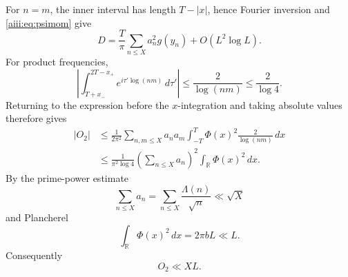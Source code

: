 \documentclass[11pt]{article}
\newcommand{\R}{\mathbb R}
\begin{document}
For $n=m$, the inner interval has length $T-|x|$, hence Fourier inversion
and \eqref{aiii:eq:psimom} give
\begin{equation}\label{aiii:eq:D}
 D=\frac{T}{\pi}\sum_{n\le X}a_n^2g(y_n)
 +O(L^2\log L).
\end{equation}
For product frequencies,
\[
 \left|\int_{T+x_-}^{2T-x_+}
 e^{i\tau'\log(nm)}\,d\tau'\right|
 \le\frac2{\log(nm)}
 \le\frac2{\log4}.
\]
Returning to the expression before the $x$-integration and taking absolute
values therefore gives
\begin{align*}
 |O_2|
 &\le
 \frac{1}{2\pi^2}
 \sum_{n,m\le X}a_na_m
 \int_{-T}^{T}\Phi(x)^2
 \frac{2}{\log(nm)}\,dx\\
 &\le
 \frac{1}{\pi^2\log4}
 \left(\sum_{n\le X}a_n\right)^2
 \int_{\R}\Phi(x)^2\,dx.
\end{align*}
By the prime-power estimate
\[
 \sum_{n\le X}a_n
 =
 \sum_{n\le X}\frac{\Lambda(n)}{\sqrt n}
 \ll \sqrt X
\]
and Plancherel
\[
 \int_{\R}\Phi(x)^2\,dx=2\pi bL\ll L.
\]
Consequently
\begin{equation}\label{aiii:eq:O2}
 \boxed{O_2\ll XL.}
\end{equation}
\end{document}
